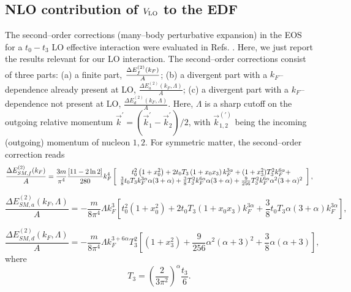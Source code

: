 \documentclass[aps,11pt,prc,preprint,superscriptaddress,nofootinbib]{revtex4}
\begin{document}
\subsection{NLO contribution of $V_{\rm LO}$ to the EDF}
The second--order corrections (many--body perturbative expansion) in the EOS for a $t_0-t_3$ LO effective interaction
were evaluated in Refs. \cite{mog,ym,kaiser}. Here, we just report the results
relevant for our LO interaction. The second--order 
corrections consist of three parts: (a) a finite part, $\frac{%
\Delta E_{f}^{(2)}(k_F)}{A}$; (b) a divergent part with a $k_F$--dependence 
already present at LO, $\frac{\Delta E_{a}^{(2)}(k_F,\Lambda )%
}{A}$; (c) a divergent part with a $k_F$--dependence not present at LO, $%
\frac{\Delta E_{d}^{(2)}(k_F,\Lambda )}{A}$. Here, $\Lambda $ is a sharp
cutoff on the outgoing relative momentum $\vec{k}^{\prime }=(\vec{k}%
_{1}^{\prime }-\vec{k}_{2}^{\prime })/2$, with $\vec{k}_{1,2}^{(\prime )}$
being the incoming (outgoing) momentum of nucleon $1,2$. For symmetric
matter, the second--order correction reads 
\begin{equation}
\frac{\Delta E_{SM,f}^{(2)}(k_{F})}{A}=\frac{3m}{\pi ^{4}}\frac{\left[11-2\ln 2 \right]}{%
280}k_{F}^{4}\left[ 
\begin{array}{c}
t_{0}^{2}\left( 1+x_{0}^{2}\right) +2t_{0}T_{3}\left( 1+x_{0}x_{3}\right)
k_{F}^{3\alpha }+(1+x_{3}^{2})T_{3}^{2}k_{F}^{6\alpha }+ \\ 
\frac{3}{8}t_{0}T_{3}k_{F}^{3\alpha }\alpha (3+\alpha )+\frac{3}{8}%
T_{3}^{2}k_{F}^{6\alpha }\alpha (3+\alpha )+\frac{9}{256}T_{3}^{2}k_{F}^{6%
\alpha }\alpha ^{2}(3+\alpha )^{2}%
\end{array}%
\right] ,  \label{terms1}
\end{equation}

\begin{equation}
\frac{\Delta E_{SM,a}^{(2)}(k_{F},\Lambda )}{A}=-\frac{m}{8\pi ^{4}}\Lambda
k_{F}^{3}\left[ t_{0}^{2}\left( 1+x_{0}^{2}\right) +2t_{0}T_{3}\left(
1+x_{0}x_{3}\right) k_{F}^{3\alpha }+\frac{3}{8}t_{0}T_{3}\alpha (3+\alpha
)k_{F}^{3\alpha }\right] ,  \label{terms2}
\end{equation}

\begin{equation}
\frac{\Delta E_{SM,d}^{(2)}(k_{F},\Lambda )}{A}=-\frac{m}{8\pi ^{4}}\Lambda
k_{F}^{3+6\alpha }T_{3}^{2}\left[ (1+x_{3}^{2})+\frac{9}{256}\alpha
^{2}(\alpha +3)^{2}+\frac{3}{8}\alpha (\alpha +3)\right] ,  \label{terms3}
\end{equation}%
where%
\begin{equation}
T_{3}=\left(\frac{2}{3\pi ^{2}}\right)^{\alpha }\frac{t_{3}}{6}.
\end{equation}
\end{document}
